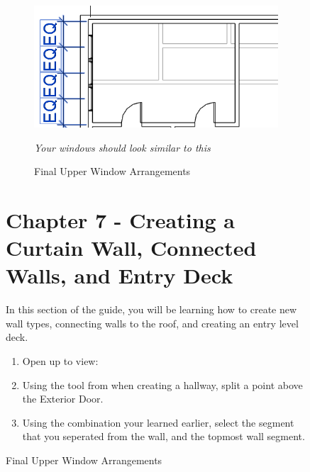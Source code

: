 \documentclass{tufte-book} %
\begin{document}
\begin{figure}
\begin{enumerate}
		\begin{figure}
			\includegraphics[width=\linewidth]{revitupperwindowfinal.png}
			\caption{Final Upper Window Arrangements}
			\emph{Your windows should look similar to this}
			\label{fig:revupperwindowfinal}
		\end{figure}
\end{enumerate}
		
%
%


\chapter{Chapter 7 - Creating a Curtain Wall, Connected Walls, and Entry Deck}
\label{ch:7}
In this section of the guide, you will be learning how to create new wall types, connecting walls to the roof, and creating an entry level deck.
\begin{enumerate}


\section{Creating a Curtain Wall}
	\item Open up to view: 
	\item Using the  tool from when creating a hallway, split a point above the  Exterior Door.
	\item Using the  combination your learned earlier, select the segment that you seperated from the wall, and the topmost  wall segment.
	

\end{enumerate}
\end{figure}
\end{document}
